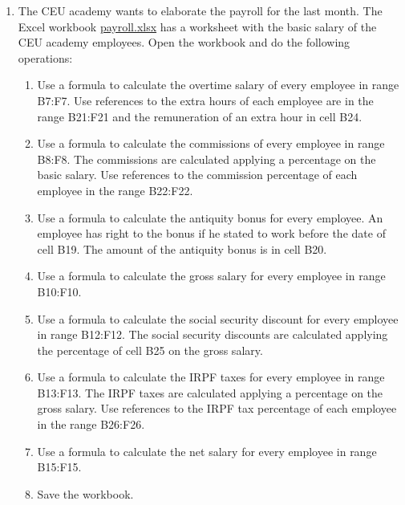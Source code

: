 \begin{enumerate}[leftmargin=*,resume]
\item The CEU academy wants to elaborate the payroll for the last month. 
The Excel workbook
\href{http://aprendeconalf.es/office/excel/exercises/formulas/payroll.xlsx}{\textsf{payroll.xlsx}} has a
worksheet with the basic salary of the CEU academy employees. 
Open the workbook and do the following operations:
\begin{enumerate}
\item Use a formula to calculate the overtime salary of every employee in range B7:F7. Use references to the extra hours
of each employee are in the range B21:F21 and the remuneration of an extra hour in cell B24.
\item Use a formula to calculate the commissions of every employee in range B8:F8.
The commissions are calculated applying a percentage on the basic salary.
Use references to the commission percentage of each employee in the range B22:F22.
\item Use a formula to calculate the antiquity bonus for every employee. An employee has right to the bonus if he stated
to work before the date of cell B19. The amount of the antiquity bonus is in cell B20.
\item Use a formula to calculate the gross salary for every employee in range B10:F10.
\item Use a formula to calculate the social security discount for every employee in range B12:F12.
The social security discounts are calculated applying the percentage of cell B25 on the gross salary. 
\item Use a formula to calculate the IRPF taxes for every employee in range B13:F13. 
The IRPF taxes are calculated applying a percentage on the gross salary.
Use references to the IRPF tax percentage of each employee in the range B26:F26.
\item Use a formula to calculate the net salary for every employee in range B15:F15.
\item Save the workbook.
\end{enumerate}


\end{enumerate}
